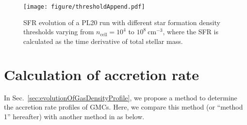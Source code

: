 \documentclass[fleqn,usenatbib]{mnras}
\begin{document}
\begin{figure}
\texttt{[image: figure/thresholdAppend.pdf]}
\caption{SFR evolution of a PL20 run with different star formation density thresholds varying from $n_\mathrm{cell}=10^4$ to $10^8\ \mathrm{cm^{-3}}$, where the SFR is calculated as the time derivative of total stellar mass. }
  \label{fig:thresholdAppend}
\end{figure}


\section{Calculation of accretion rate}
\label{append:accretionRate}

In Sec.~\ref{sec:evolutionOfGasDensityProfile}, we propose a method to determine the accretion rate profiles of GMCs. Here, we compare this method (or ``method 1'' hereafter) with another method in \citet[][or ``method 2'' hereafter]{howard_universal_2018} as below.
\end{document}
